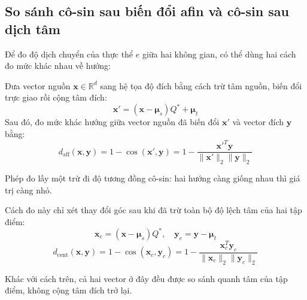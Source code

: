 \subsection{So sánh cô-sin sau biến đổi afin và cô-sin sau dịch tâm}
Để đo độ dịch chuyển của thực thể $e$ giữa hai không gian, có thể dùng hai cách đo mức khác nhau về hướng:

\begin{definition}
Đưa vector nguồn $\mathbf{x} \in \mathbb{R}^d$ sang hệ tọa độ đích bằng cách trừ tâm nguồn, biến đổi trực giao rồi cộng tâm đích:
\begin{equation}
\mathbf{x}' = (\mathbf{x} - \boldsymbol{\mu}_s) Q^* + \boldsymbol{\mu}_t
\label{eq:affine_transform}
\end{equation}
Sau đó, đo mức khác hướng giữa vector nguồn đã biến đổi $\mathbf{x}'$ và vector đích $\mathbf{y}$ bằng:
\begin{equation}
d_{\text{aff}}(\mathbf{x}, \mathbf{y}) = 1 - \cos(\mathbf{x}', \mathbf{y}) = 1 - \frac{{\mathbf{x}'}^T \mathbf{y}}{\|\mathbf{x}'\|_2 \|\mathbf{y}\|_2}
\label{eq:affine_cosine}
\end{equation}
\end{definition}
Phép đo lấy một trừ đi độ tương đồng cô-sin: hai hướng càng giống nhau thì giá trị càng nhỏ.
\begin{definition}
Cách đo này chỉ xét thay đổi góc sau khi đã trừ toàn bộ độ lệch tâm của hai tập điểm:
\begin{equation}
\mathbf{x}_c = (\mathbf{x} - \boldsymbol{\mu}_s) Q^*, \quad \mathbf{y}_c = \mathbf{y} - \boldsymbol{\mu}_t
\end{equation}
\begin{equation}
d_{\text{cent}}(\mathbf{x}, \mathbf{y}) = 1 - \cos(\mathbf{x}_c, \mathbf{y}_c) = 1 - \frac{\mathbf{x}_c^T \mathbf{y}_c}{\|\mathbf{x}_c\|_2 \|\mathbf{y}_c\|_2}
\label{eq:centered_cosine}
\end{equation}
\end{definition}
Khác với cách trên, cả hai vector ở đây đều được so sánh quanh tâm của tập điểm, không cộng tâm đích trở lại.
